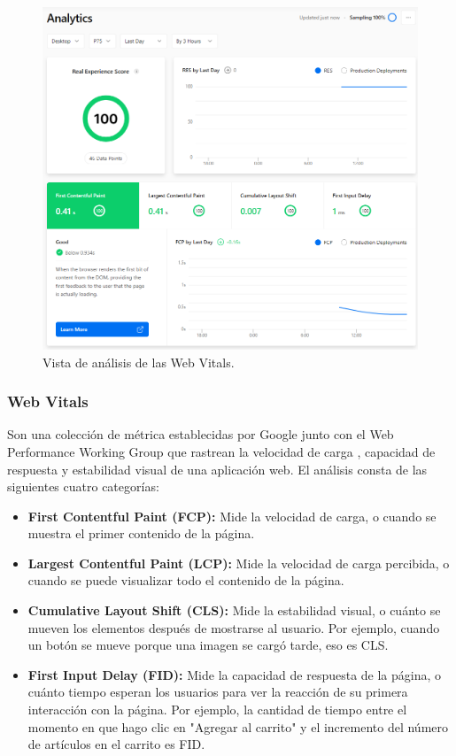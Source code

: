 \documentclass[12pt,twoside,titlepage]{report}
\begin{document}
{\begin{figure}[H]
    \centering
    \includegraphics[scale=0.5]{Vercel/RealExperienceScore}
    \caption{Vista de análisis de las Web Vitals.}
    \label{fig:Vercel_metrics}
\end{figure}

\subsubsection{Web Vitals}

Son una colección de métrica establecidas por Google \cite{webdev} junto con el Web Performance Working Group \cite{w3} que rastrean la velocidad de carga , capacidad de respuesta y estabilidad visual de una aplicación web. El análisis consta de las siguientes cuatro categorías:

\begin{itemize}
    \item\textbf{First Contentful Paint (FCP):} Mide la velocidad de carga, o cuando se muestra el primer contenido de la página.
    \item\textbf{Largest Contentful Paint (LCP):} Mide la velocidad de carga percibida, o cuando se puede visualizar todo el contenido de la página.
    \item\textbf{Cumulative Layout Shift (CLS):} Mide la estabilidad visual, o cuánto se mueven los elementos después de mostrarse al usuario. Por ejemplo, cuando un botón se mueve porque una imagen se cargó tarde, eso es CLS.
    \item\textbf{First Input Delay (FID):} Mide la capacidad de respuesta de la página, o cuánto tiempo esperan los usuarios para ver la reacción de su primera interacción con la página. Por ejemplo, la cantidad de tiempo entre el momento en que hago clic en "Agregar al carrito" y el incremento del número de artículos en el carrito es FID.
\end{itemize}

}
\end{document}
